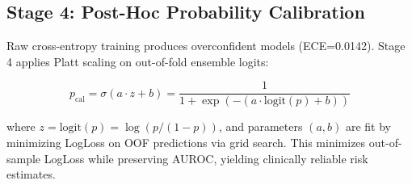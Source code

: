 \subsection{Stage 4: Post-Hoc Probability Calibration}
\label{sec:framework_stage4}
Raw cross-entropy training produces overconfident models (ECE=0.0142). Stage 4 applies Platt scaling on out-of-fold ensemble logits:

\begin{equation}
    p_{\text{cal}} = \sigma(a \cdot z + b) = \frac{1}{1 + \exp(-(a \cdot \text{logit}(p) + b))}
\end{equation}

where $z = \text{logit}(p) = \log(p / (1-p))$, and parameters $(a,b)$ are fit by minimizing LogLoss on OOF predictions via grid search. This minimizes out-of-sample LogLoss while preserving AUROC, yielding clinically reliable risk estimates.